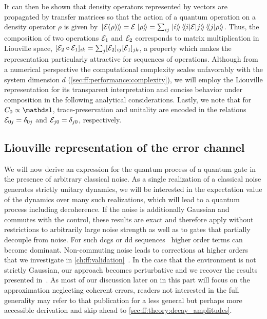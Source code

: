 It can then be shown that density operators represented by vectors are propagated by transfer matrices so that the action of a quantum operation \qp on a density operator $\rho$ is given by $\dket{\qp(\rho)} = \qp\dket{\rho} = \sum_{ij}\dket{i}\dmel{i}{\qp}{j}\dip{j}{\rho}$.
Thus, the composition of two operations $\mathcal{E}_1$ and $\mathcal{E}_2$ corresponds to matrix multiplication in Liouville space, $[\mathcal{E}_2\circ\mathcal{E}_1]_{ik} = \sum_j[\mathcal{E}_2]_{ij}[\mathcal{E}_1]_{jk}$, a property which makes the representation particularly attractive for sequences of operations.
Although from a numerical perspective the computational complexity scales unfavorably with the system dimension $d$ (\cf \cref{sec:ff:performance:complexity}),  we will employ the Liouville representation for its transparent interpretation and concise behavior under composition in the following analytical considerations.
Lastly, we note that for $C_0\propto\eye$, trace-preservation and unitality are encoded in the relations $\mathcal{E}_{0j} = \delta_{0j}$ and $\mathcal{E}_{j0} = \delta_{j0}$, respectively.

\subsection{Liouville representation of the error channel}\label{subsec:ff:theory:transfer_matrix:derivation}
We will now derive an expression for the quantum process of a quantum gate in the presence of arbitrary classical noise.
As a single realization of a classical noise generates strictly unitary dynamics, we will be interested in the expectation value of the dynamics over many such realizations, which will lead to a quantum process including decoherence.
If the noise is additionally Gaussian and commutes with the control, these results are exact and therefore apply without restrictions to arbitrarily large noise strength as well as to gates that partially decouple from noise.
For such \glspl{dcg} or \gls{dd} sequences~\cite{Khodjasteh2009,Cywinski2008} higher order terms can become dominant.
Non-commuting noise leads to corrections at higher orders that we investigate in \cref{ch:ff:validation}~.
In the case that the environment is not strictly Gaussian, our approach becomes perturbative and we recover the results presented in~.
As most of our discussion later on in this part will focus on the approximation neglecting coherent errors, readers not interested in the full generality may refer to that publication for a less general but perhaps more accessible derivation and skip ahead to \cref{sec:ff:theory:decay_amplitudes}.

